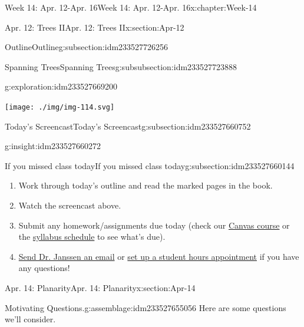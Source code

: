 \documentclass[oneside,10pt,]{book}
\numberwithin{equation}{section}
\begin{document}
\begin{chapterptx}{Week 14: Apr. 12-Apr. 16}{}{Week 14: Apr. 12-Apr. 16}{}{}{x:chapter:Week-14}
\begin{sectionptx}{Apr. 12: Trees II}{}{Apr. 12: Trees II}{}{}{x:section:Apr-12}
\begin{subsectionptx}{Outline}{}{Outline}{}{}{g:subsection:idm233527726256}
\begin{subsubsectionptx}{Spanning Trees}{}{Spanning Trees}{}{}{g:subsubsection:idm233527723888}
\begin{exploration}{}{g:exploration:idm233527669200}
\begin{image}{0.3}{0.4}{0.3}%
\texttt{[image: ./img/img-114.svg]}
\end{image}%
\end{exploration}%
\end{subsubsectionptx}
\end{subsectionptx}
%
%
\typeout{************************************************}
\typeout{************************************************}
%
\begin{subsectionptx}{Today's Screencast}{}{Today's Screencast}{}{}{g:subsection:idm233527660752}
\begin{insight}{}{g:insight:idm233527660272}%
\end{insight}
\end{subsectionptx}
%
%
\typeout{************************************************}
\typeout{************************************************}
%
\begin{subsectionptx}{If you missed class today}{}{If you missed class today}{}{}{g:subsection:idm233527660144}
%
\begin{enumerate}
\item{}Work through today's outline and read the marked pages in the book.%
\item{}Watch the screencast above.%
\item{}Submit any homework\slash{}assignments due today (check our \href{https://dordt.instructure.com/courses/3110050}{Canvas course} or the \href{https://prof.mkjanssen.org/ds/index.html\#schedule}{syllabus schedule} to see what's due).%
\item{}\href{mailto:mike.janssen@dordt.edu}{Send Dr. Janssen an email} or \href{https://calendly.com/mkjanssen/student-hours}{set up a student hours appointment} if you have any questions!%
\end{enumerate}
\end{subsectionptx}
\end{sectionptx}
%
%
\typeout{************************************************}
\typeout{************************************************}
%
\begin{sectionptx}{Apr. 14: Planarity}{}{Apr. 14: Planarity}{}{}{x:section:Apr-14}
\begin{introduction}{}%
\begin{assemblage}{Motivating Questions.}{g:assemblage:idm233527655056}%
Here are some questions we'll consider. %

\end{assemblage}
\end{introduction}
\end{sectionptx}
\end{chapterptx}
\end{document}
